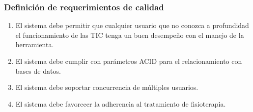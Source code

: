 \documentclass[12pt]{article}
\begin{document}
\subsubsection{Definición de requerimientos de calidad}

\begin{enumerate}[start=1,label={\bfseries RNF\arabic*.}]




\item El sistema debe permitir que cualquier usuario que no conozca a profundidad el funcionamiento de las TIC tenga un buen desempeño con el manejo de la herramienta.




 \item El sistema debe cumplir con parámetros ACID para el relacionamiento con bases de datos.
 

\item El sistema debe soportar concurrencia de múltiples usuarios.
        
\item El sistema debe favorecer la adherencia al tratamiento de fisioterapia.

\end{enumerate}
\end{document}
